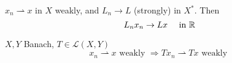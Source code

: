\begin{proposition}
    \(x_n \rightharpoonup x \) in \(X\) weakly, and \(L_n \to L\) (strongly) in \(X^*\). Then
    \[
        L_n x_n \to Lx \quad \text{ in } \mathbb{R}
    \]
\end{proposition}
\begin{proposition}
    \(X, Y\) Banach, \(T \in \mathcal{L}(X, Y)\)
    \[
        x_n \rightharpoonup x \text{ weakly } \Rightarrow Tx_n \rightharpoonup Tx \text{ weakly }
    \]
\end{proposition}